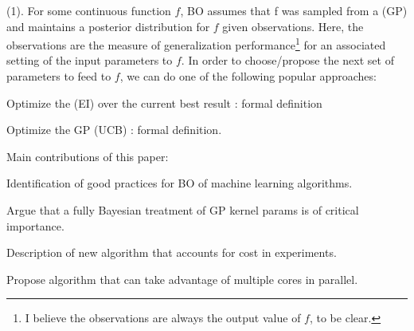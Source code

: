 \documentclass[11pt]{article}
\begin{document}









 (1). For some continuous function $f$, BO assumes that f was sampled from a  (GP) and maintains a posterior distribution for $f$ given observations. Here, the observations are the measure of generalization performance\footnote{I believe the observations are always the output value of $f$, to be clear.} for an associated setting of the input parameters to $f$. In order to choose/propose the next set of parameters to feed to $f$, we can do one of the following popular approaches:
\begin{compactitem}
	\item Optimize the  (EI) over the current best result : formal definition
	
	\item Optimize the GP  (UCB) : formal definition.
\end{compactitem}
Main contributions of this paper:
\begin{compactitem}
	\item Identification of good practices for BO of machine learning algorithms.
	
	\item Argue that a fully Bayesian treatment of GP kernel params is of critical importance. 
	
	\item Description of new algorithm that accounts for cost in experiments. 
	
	\item Propose algorithm that can take advantage of multiple cores in parallel.
\end{compactitem}
\end{document}
